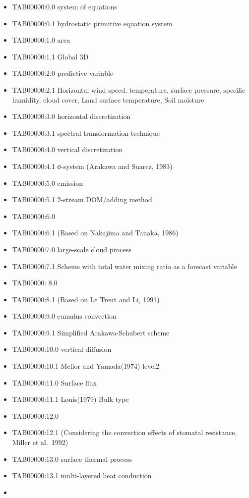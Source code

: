 \begin{itemize}
\item
  TAB00000:0.0 system of equations
\item
  TAB00000:0.1 hydrostatic primitive equation system
\item
  TAB00000:1.0 area
\item
  TAB00000:1.1 Global 3D
\item
  TAB00000:2.0 predictive variable
\item
  TAB00000:2.1 Horizontal wind speed, temperature, surface pressure,
  specific humidity, cloud cover, Land surface temperature, Soil
  moisture
\item
  TAB00000:3.0 horizontal discretization
\item
  TAB00000:3.1 spectral transformation technique
\item
  TAB00000:4.0 vertical discretization
\item
  TAB00000:4.1 σ-system (Arakawa and Suarez, 1983)
\item
  TAB00000:5.0 emission
\item
  TAB00000:5.1 2-stream DOM/adding method
\item
  TAB00000:6.0
\item
  TAB00000:6.1 (Based on Nakajima and Tanaka, 1986)
\item
  TAB00000:7.0 large-scale cloud process
\item
  TAB00000:7.1 Scheme with total water mixing ratio as a forecast
  variable
\item
  TAB00000: 8.0
\item
  TAB00000:8.1 (Based on Le Treut and Li, 1991)
\item
  TAB00000:9.0 cumulus convection
\item
  TAB00000:9.1 Simplified Arakawa-Schubert scheme
\item
  TAB00000:10.0 vertical diffusion
\item
  TAB00000:10.1 Mellor and Yamada(1974) level2
\item
  TAB00000:11.0 Surface flux
\item
  TAB00000:11.1 Louis(1979) Bulk type
\item
  TAB00000:12.0
\item
  TAB00000:12.1 (Considering the convection effects of stomatal
  resistance, Miller et al.~1992)
\item
  TAB00000:13.0 surface thermal process
\item
  TAB00000:13.1 multi-layered heat conduction
\item

\end{itemize}

